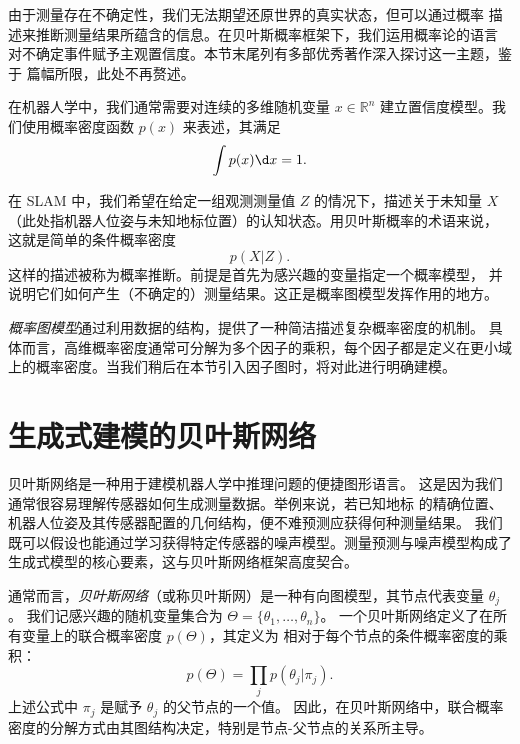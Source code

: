 \documentclass[fontset=none]{Notes}
\begin{document}
由于测量存在不确定性，我们无法期望还原世界的真实状态，但可以通过概率
描述来推断测量结果所蕴含的信息。在贝叶斯概率框架下，我们运用概率论的语言
对不确定事件赋予主观置信度。本节末尾列有多部优秀著作深入探讨这一主题，鉴于
篇幅所限，此处不再赘述。

在机器人学中，我们通常需要对连续的多维随机变量 $x\in \mathbb{R}^n$
建立置信度模型。我们使用概率密度函数 $p(x)$ 来表述，其满足
\[
  \int p(x)\d x=1.
\]

在 SLAM 中，我们希望在给定一组观测测量值 $Z$ 的情况下，描述关于未知量 $X$
（此处指机器人位姿与未知地标位置）的认知状态。用贝叶斯概率的术语来说，
这就是简单的条件概率密度
\[
  p(X|Z).
\]
这样的描述被称为概率推断。前提是首先为感兴趣的变量指定一个概率模型，
并说明它们如何产生（不确定的）测量结果。这正是概率图模型发挥作用的地方。

\emph{概率图模型}通过利用数据的结构，提供了一种简洁描述复杂概率密度的机制。
具体而言，高维概率密度通常可分解为多个因子的乘积，每个因子都是定义在更小域
上的概率密度。当我们稍后在本节引入因子图时，将对此进行明确建模。

\section{生成式建模的贝叶斯网络}

贝叶斯网络是一种用于建模机器人学中推理问题的便捷图形语言。
这是因为我们通常很容易理解传感器如何生成测量数据。举例来说，若已知地标
的精确位置、机器人位姿及其传感器配置的几何结构，便不难预测应获得何种测量结果。
我们既可以假设也能通过学习获得特定传感器的噪声模型。测量预测与噪声模型构成了
生成式模型的核心要素，这与贝叶斯网络框架高度契合。

通常而言，\emph{贝叶斯网络}（或称贝叶斯网）是一种有向图模型，其节点代表变量 $\theta_j$。
我们记感兴趣的随机变量集合为 $\Theta=\{\theta_1,\dots,\theta_n\}$。
一个贝叶斯网络定义了在所有变量上的联合概率密度 $p(\Theta)$，其定义为
相对于每个节点的条件概率密度的乘积：
\[
  p(\Theta)=\prod_{j} p(\theta_j|\pi_j).
\]
上述公式中 $\pi_j$ 是赋予 $\theta_j$ 的父节点的一个值。
因此，在贝叶斯网络中，联合概率密度的分解方式由其图结构决定，特别是节点-父节点的关系所主导。
\end{document}
